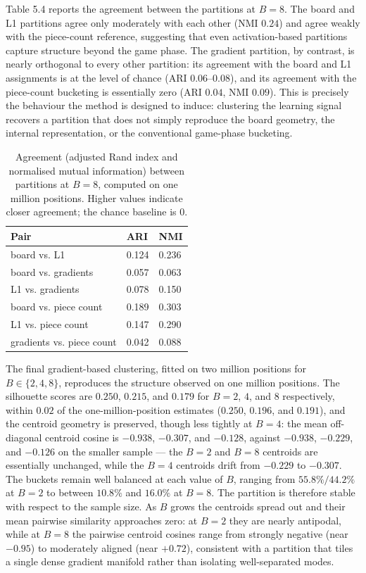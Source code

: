 Table 5.4 reports the agreement between the partitions at $B=8$. The board and L1 partitions agree only moderately with each other (NMI $0.24$) and agree weakly with the piece-count reference, suggesting that even activation-based partitions capture structure beyond the game phase. The gradient partition, by contrast, is nearly orthogonal to every other partition: its agreement with the board and L1 assignments is at the level of chance (ARI $0.06$--$0.08$), and its agreement with the piece-count bucketing is essentially zero (ARI $0.04$, NMI $0.09$). This is precisely the behaviour the method is designed to induce: clustering the learning signal recovers a partition that does not simply reproduce the board geometry, the internal representation, or the conventional game-phase bucketing.

\begin{table}[H]
\centering
\caption{Agreement (adjusted Rand index and normalised mutual information) between partitions at $B=8$, computed on one million positions. Higher values indicate closer agreement; the chance baseline is $0$.}
\small
\begin{tabular}{lll}
\toprule
Pair & ARI & NMI \\
\midrule
board vs. L1 & 0.124 & 0.236 \\
board vs. gradients & 0.057 & 0.063 \\
L1 vs. gradients & 0.078 & 0.150 \\
board vs. piece count & 0.189 & 0.303 \\
L1 vs. piece count & 0.147 & 0.290 \\
gradients vs. piece count & 0.042 & 0.088 \\
\bottomrule
\end{tabular}
\end{table}


The final gradient-based clustering, fitted on two million positions for $B \in \{2, 4, 8\}$, reproduces the structure observed on one million positions. The silhouette scores are $0.250$, $0.215$, and $0.179$ for $B=2$, $4$, and $8$ respectively, within $0.02$ of the one-million-position estimates ($0.250$, $0.196$, and $0.191$), and the centroid geometry is preserved, though less tightly at $B=4$: the mean off-diagonal centroid cosine is $-0.938$, $-0.307$, and $-0.128$, against $-0.938$, $-0.229$, and $-0.126$ on the smaller sample --- the $B=2$ and $B=8$ centroids are essentially unchanged, while the $B=4$ centroids drift from $-0.229$ to $-0.307$. The buckets remain well balanced at each value of $B$, ranging from $55.8\%/44.2\%$ at $B=2$ to between $10.8\%$ and $16.0\%$ at $B=8$. The partition is therefore stable with respect to the sample size. As $B$ grows the centroids spread out and their mean pairwise similarity approaches zero: at $B=2$ they are nearly antipodal, while at $B=8$ the pairwise centroid cosines range from strongly negative (near $-0.95$) to moderately aligned (near $+0.72$), consistent with a partition that tiles a single dense gradient manifold rather than isolating well-separated modes.


